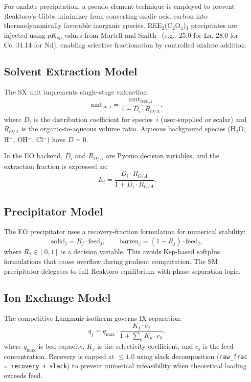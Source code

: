 \documentclass[11pt]{article}
\begin{document}
For oxalate precipitation, a pseudo-element technique is employed to
prevent Reaktoro's Gibbs minimizer from converting oxalic acid carbon
into thermodynamically favorable inorganic species.  REE$_2$(C$_2$O$_4$)$_3$
precipitates are injected using $pK_{sp}$ values from Martell and
Smith~\citep{martell2004critical} (e.g., 25.0 for La, 28.0 for Ce,
31.14 for Nd), enabling selective fractionation by controlled oxalate
addition.


\subsection{Solvent Extraction Model}

The SX unit implements single-stage extraction:
\begin{equation}\label{eq:sx}
  \text{amt}_{\text{aq},i}
    = \frac{\text{amt}_{\text{feed},i}}{1 + D_i \cdot R_{O/A}},
\end{equation}
where $D_i$ is the distribution coefficient for species~$i$
(user-supplied or scalar) and $R_{O/A}$ is the organic-to-aqueous
volume ratio.  Aqueous background species (H$_2$O, H$^+$, OH$^-$,
Cl$^-$) have $D = 0$.

In the EO backend, $D_i$ and $R_{O/A}$ are Pyomo decision variables,
and the extraction fraction is expressed as:
\begin{equation}
  E_i = \frac{D_i \cdot R_{O/A}}{1 + D_i \cdot R_{O/A}}.
\end{equation}

\subsection{Precipitator Model}

The EO precipitator uses a recovery-fraction formulation for numerical
stability:
\begin{equation}
  \text{solid}_j = R_j \cdot \text{feed}_j,
  \qquad
  \text{barren}_j = (1 - R_j) \cdot \text{feed}_j,
\end{equation}
where $R_j \in [0, 1]$ is a decision variable.  This avoids
Ksp-based softplus formulations that cause overflow during gradient
computation.  The SM precipitator delegates to full Reaktoro equilibrium
with phase-separation logic.

\subsection{Ion Exchange Model}

The competitive Langmuir isotherm governs IX separation:
\begin{equation}\label{eq:ix}
  q_j = q_{\max} \cdot \frac{K_j \cdot c_j}{1 + \sum_k K_k \cdot c_k},
\end{equation}
where $q_{\max}$ is bed capacity, $K_j$ is the selectivity coefficient,
and $c_j$ is the feed concentration.  Recovery is capped at $\leq 1.0$
using slack decomposition (\texttt{raw\_frac = recovery + slack}) to
prevent numerical infeasibility when theoretical loading exceeds feed.
\end{document}
